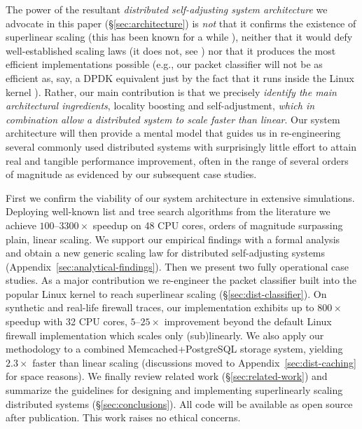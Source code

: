 The power of the resultant \emph{distributed self-adjusting system architecture} we advocate in this paper (\S\ref{sec:architecture}) is \emph{not} that it confirms the existence of superlinear scaling (this has been known for a while \cite{dobb-1, dobb-2}), neither that it would defy well-established scaling laws (it does not, see \cite{80148, gunther-hotsos, 10.1016/0167-8191(86)90024-4,10.1145/2773212.2789974}) nor that it produces the most efficient implementations possible (e.g., our packet classifier will not be as efficient as, say, a DPDK equivalent \cite{rte-acl} just by the fact that it runs inside the Linux kernel \cite{295475}). Rather, our main contribution is that we precisely \emph{identify the main architectural ingredients}, locality boosting and self-adjustment, \emph{which in combination allow a distributed system to scale faster than linear}. Our system architecture will then provide a mental model that guides us in re-engineering several commonly used distributed systems with surprisingly little effort to attain real and tangible performance improvement, often in the range of several orders of magnitude as evidenced by our subsequent case studies.

First we confirm the viability of our system architecture in extensive simulations. Deploying well-known list and tree search algorithms from the literature %
we achieve $100$--$3300\times$ speedup on 48 CPU cores, orders of magnitude surpassing plain, linear scaling. We support our empirical findings with a formal analysis and obtain a new generic scaling law for distributed self-adjusting systems (Appendix~\ref{sec:analytical-findings}). Then we present two fully operational case studies. As a major contribution we re-engineer the packet classifier built into the popular Linux kernel to reach superlinear scaling (\S\ref{sec:dist-classifier}). On synthetic and real-life firewall traces, our implementation exhibits up to $800\times$ speedup with 32 CPU cores, $5$--$25\times$ improvement beyond the default Linux firewall implementation which scales only (sub)linearly. We also apply our methodology to a combined Memcached+PostgreSQL storage system, yielding $2.3\times$ faster than linear scaling (discussions moved to Appendix~\ref{sec:dist-caching} for space reasons). We finally review related work (\S\ref{sec:related-work}) and summarize the guidelines for designing and implementing superlinearly scaling distributed systems (\S\ref{sec:conclusions}). All code will be available as open source after publication. This work raises no ethical concerns. 



